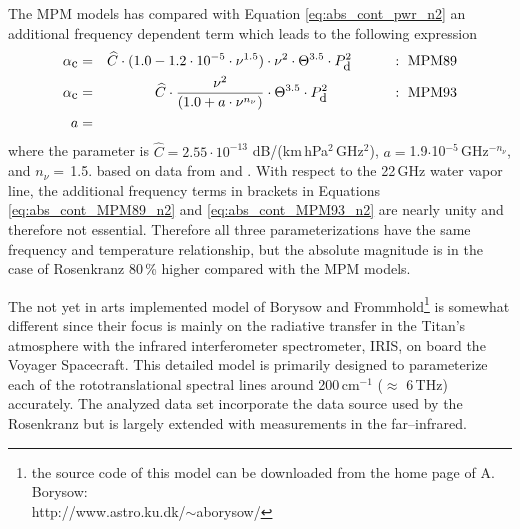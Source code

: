 {The MPM models has compared with Equation \ref{eq:abs_cont_pwr_n2} 
an additional frequency dependent term which leads to the 
following expression
\begin{eqnarray}
  \label{eq:abs_cont_MPM89_n2}
    \alphac &=& \widehat{C} \cdot (1.0-1.2\cdot10^{-5}\cdot
               \nu^{1.5}) \cdot \nu^2 \cdot \Theta^{3.5} \cdot \pda^2
               \hspace*{10mm}:~\mbox{MPM89}\\
%
  \label{eq:abs_cont_MPM93_n2}
    \alphac &=& \widehat{C} \cdot \frac{\nu^2}{(1.0+a\cdot \nu^{n_{\nu}})} 
                \cdot \Theta^{3.5} \cdot \pda^2
                \hspace*{16mm}:~\mbox{MPM93}\\
          a &=&  
\nonumber
\end{eqnarray}
where the parameter is $\widehat{C} = 2.55\cdot 10^{-13}$ dB/(km\,hPa$^2$\,GHz$^2$), 
$a=$1.9$\cdot$10$^{-5}$\,GHz$^{-n_{\nu}}$, and $n_{\nu}=$\,1.5.
based on data from \citet{stankevich:74} and \citet{stonenw:84}. 
With respect to the 22\,GHz water vapor line, 
the additional frequency terms in brackets in 
Equations \ref{eq:abs_cont_MPM89_n2} and \ref{eq:abs_cont_MPM93_n2}
are nearly unity and therefore not essential. Therefore all
three parameterizations have the same frequency and temperature
relationship, but the absolute magnitude is in the case of Rosenkranz
80\,\% higher compared with the MPM models.

The not yet in arts implemented model of Borysow and 
Frommhold\footnote{{the source code of this
  model can be downloaded from the home page of A. Borysow:}\\
  http://www.astro.ku.dk/$\sim$aborysow/} is somewhat different since their 
focus is mainly on the radiative transfer in the Titan's atmosphere
with the infrared interferometer spectrometer, IRIS, on board the
Voyager Spacecraft. This detailed model is primarily
designed to parameterize each of the rototranslational spectral lines 
around 200\,cm$^{-1}$ ($\approx$ 6\,THz) accurately. The analyzed data
set incorporate the data source used by the Rosenkranz but is largely 
extended with measurements in the far--infrared.



}
